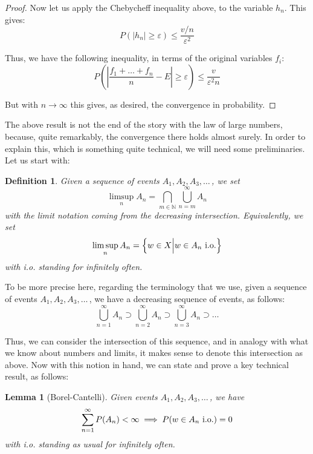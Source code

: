 \documentclass[12pt]{amsbook}
\newtheorem{definition}[theorem]{Definition}
\newtheorem{lemma}[theorem]{Lemma}
\begin{document}
\begin{proof}
Now let us apply the Chebycheff inequality above, to the variable $h_n$. This gives:
$$P(|h_n|\geq\varepsilon)\leq\frac{v/n}{\varepsilon^2}$$

Thus, we have the following inequality, in terms of the original variables $f_i$:
$$P\left(\left|\frac{f_1+\ldots+f_n}{n}-E\right|\geq\varepsilon\right)\leq\frac{v}{\varepsilon^2 n}$$

But with $n\to\infty$ this gives, as desired, the convergence in probability.
\end{proof}

The above result is not the end of the story with the law of large numbers, because, quite remarkably, the convergence there holds almost surely. In order to explain this, which is something quite technical, we will need some preliminaries. Let us start with:


\begin{definition}
Given a sequence of events $A_1,A_2,A_3,\ldots\,$, we set
$$\limsup_nA_n=\bigcap_{m\in\mathbb N}\bigcup_{n=m}^\infty A_n$$
with the limit notation coming from the decreasing intersection. Equivalently, we set
$$\limsup_nA_n=\left\{w\in X\Big|w\in A_n\ {\rm i.o.}\right\}$$
with i.o. standing for infinitely often.
\end{definition}

To be more precise here, regarding the terminology that we use, given a sequence of events $A_1,A_2,A_3,\ldots\,$, we have a decreasing sequence of events, as follows:
$$\bigcup_{n=1}^\infty A_n\supset\bigcup_{n=2}^\infty A_n\supset\bigcup_{n=3}^\infty A_n\supset\ldots$$

Thus, we can consider the intersection of this sequence, and in analogy with what we know about numbers and limits, it makes sense to denote this intersection as above. Now with this notion in hand, we can state and prove a key technical result, as follows:


\begin{lemma}[Borel-Cantelli]
Given events $A_1,A_2,A_3,\ldots\,$, we have
$$\sum_{n=1}^\infty P(A_n)<\infty\implies P(w\in A_n\ {\rm i.o.})=0$$
with i.o. standing as usual for infinitely often.
\end{lemma}
\end{document}
